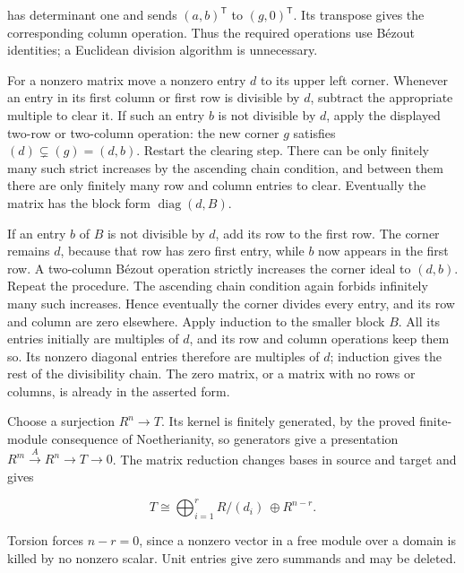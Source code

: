 \documentclass[
]{article}
\begin{document}
has determinant one and sends \((a,b)^{\mathsf T}\) to
\((g,0)^{\mathsf T}\). Its transpose gives the corresponding column
operation. Thus the required operations use Bézout identities; a
Euclidean division algorithm is unnecessary.

For a nonzero matrix move a nonzero entry \(d\) to its upper left
corner. Whenever an entry in its first column or first row is divisible
by \(d\), subtract the appropriate multiple to clear it. If such an
entry \(b\) is not divisible by \(d\), apply the displayed two-row or
two-column operation: the new corner \(g\) satisfies
\((d)\subsetneq(g)=(d,b)\). Restart the clearing step. There can be only
finitely many such strict increases by the ascending chain condition,
and between them there are only finitely many row and column entries to
clear. Eventually the matrix has the block form
\(\operatorname{diag}(d,B)\).

If an entry \(b\) of \(B\) is not divisible by \(d\), add its row to the
first row. The corner remains \(d\), because that row has zero first
entry, while \(b\) now appears in the first row. A two-column Bézout
operation strictly increases the corner ideal to \((d,b)\). Repeat the
procedure. The ascending chain condition again forbids infinitely many
such increases. Hence eventually the corner divides every entry, and its
row and column are zero elsewhere. Apply induction to the smaller block
\(B\). All its entries initially are multiples of \(d\), and its row and
column operations keep them so. Its nonzero diagonal entries therefore
are multiples of \(d\); induction gives the rest of the divisibility
chain. The zero matrix, or a matrix with no rows or columns, is already
in the asserted form.

Choose a surjection \(R^n\to T\). Its kernel is finitely generated, by
the proved finite-module consequence of Noetherianity, so generators
give a presentation \(R^m\xrightarrow A R^n\to T\to0\). The matrix
reduction changes bases in source and target and gives

\[
T\cong\bigoplus_{i=1}^r R/(d_i)\ \oplus R^{n-r}.
\]

Torsion forces \(n-r=0\), since a nonzero vector in a free module over a
domain is killed by no nonzero scalar. Unit entries give zero summands
and may be deleted.
\end{document}
